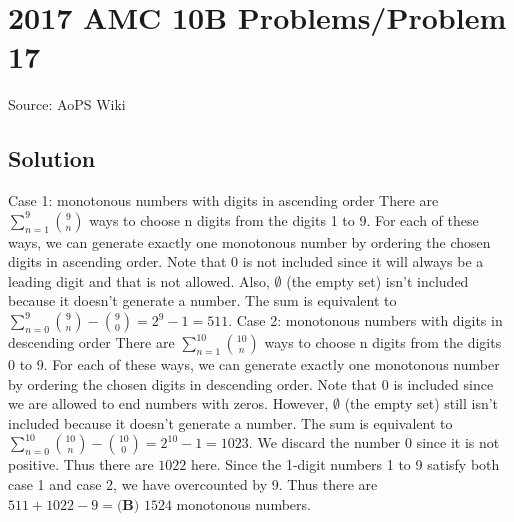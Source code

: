 \documentclass[12pt]{article}
\begin{document}
\section*{{2017 AMC 10B Problems/Problem 17}}
Source: AoPS Wiki

\subsection*{Solution}
Case 1: monotonous numbers with digits in ascending order There are $\sum_{n=1}^{9} \binom{9}{n}$ ways to choose n digits from the digits 1 to 9. For each of these ways, we can generate exactly one monotonous number by ordering the chosen digits in ascending order. Note that 0 is not included since it will always be a leading digit and that is not allowed. Also, $\emptyset$ (the empty set) isn't included because it doesn't generate a number. The sum is equivalent to $\sum_{n=0}^{9} \binom{9}{n} -\binom{9}{0} = 2^9 - 1 = 511.$ Case 2: monotonous numbers with digits in descending order There are $\sum_{n=1}^{10} \binom{10}{n}$ ways to choose n digits from the digits 0 to 9. For each of these ways, we can generate exactly one monotonous number by ordering the chosen digits in descending order. Note that 0 is included since we are allowed to end numbers with zeros. However, $\emptyset$ (the empty set) still isn't included because it doesn't generate a number. The sum is equivalent to $\sum_{n=0}^{10} \binom{10}{n} -\binom{10}{0} = 2^{10} - 1 = 1023.$ We discard the number 0 since it is not positive. Thus there are $1022$ here. Since the 1-digit numbers 1 to 9 satisfy both case 1 and case 2, we have overcounted by 9. Thus there are $511+1022-9=\boxed{\textbf{(B) } 1524}$ monotonous numbers.
\end{document}
